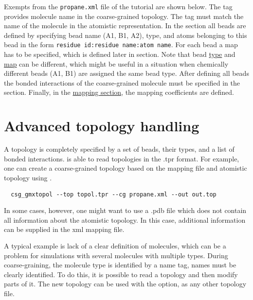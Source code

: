 Exempts from the \texttt{propane.xml} file of the tutorial are shown below. The  tag provides molecule name in the coarse-grained topology. The  tag must match the name of the molecule in the atomistic representation. In the  section all beads are defined by specifying bead name (A1, B1, A2), type, and atoms belonging to this bead in the form \texttt{residue id:residue name:atom name}. For each bead a map has to be specified, which is defined later in  section. Note that bead \hyperlink{\mapref{topology.cg_beads.cg_bead.type}}{type} and \hyperlink{\mapref{maps.map}}{map} can be different, which might be useful in a situation when chemically different beads (A1, B1) are assigned the same bead type. After defining all beads the bonded interactions of the coarse-grained molecule must be specified in the  section. Finally, in the \hyperlink{\mapref{topology.cg_beads.cg_bead.mapping}}{mapping section}, the mapping coefficients are defined.

\framebox{

}

\section{Advanced topology handling}
\label{sec:adv_topology}


A topology is completely specified by a set of beads, their types, and a list of bonded interactions. \votca is able to read topologies in the \gromacs .tpr format. For example, one can create a coarse-grained topology based on the mapping file and atomistic \gromacs topology using .
\begin{verbatim}
  csg_gmxtopol --top topol.tpr --cg propane.xml --out out.top
\end{verbatim}


In some cases, however, one might want to use a .pdb file which does not contain all information about the atomistic topology. In this case, additional information can be supplied in the xml mapping file.

A typical example is lack of a clear definition of molecules, which can be a problem for simulations with several molecules with multiple types. During coarse-graining, the molecule type is identified by a name tag, names must be clearly identified. To do this, it is possible to read a topology and then modify parts of it. The new \xml topology can be used with the  option, as any other topology file.

